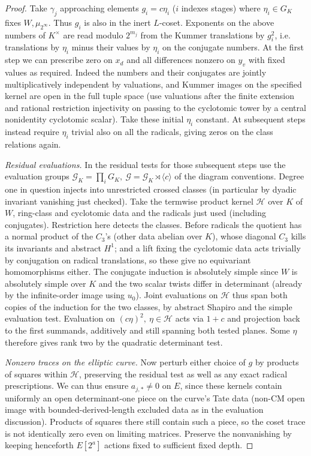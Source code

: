 \begin{proof}
Take \(\gamma_j\) approaching elements \(g_i=c\eta_i\) (\(i\) indexes stages) where \(\eta_i\in G_K\) fixes \(W,\mu_{2^\infty}\). Thus \(g_i\) is also in the inert \(L\)-coset. Exponents on the above numbers of \(K^\times\) are read modulo \(2^{m_j}\) from the Kummer translations by \(g_i^2\), i.e. translations by \(\eta_i\) minus their values by \(\eta_i\) on the conjugate numbers. At the first step we can prescribe zero on \(x_d\) and all differences nonzero on \(y_v\) with fixed values as required. Indeed the numbers and their conjugates are jointly multiplicatively independent by valuations, and Kummer images on the specified kernel are open in the full tuple space (use valuations after the finite extension and rational restriction injectivity on passing to the cyclotomic tower by a central nonidentity cyclotomic scalar). Take these initial \(\eta_i\) constant. At subsequent steps instead require \(\eta_i\) trivial also on all the radicals, giving zeros on the class relations again.

\emph{Residual evaluations.}
In the residual tests for those subsequent steps use the evaluation groups \(\mathcal G_K=\prod_i G_K,\ \mathcal G=\mathcal G_K\rtimes\langle c\rangle\) of the diagram conventions. Degree one in question injects into unrestricted crossed classes (in particular by dyadic invariant vanishing just checked). Take the termwise product kernel \(\mathcal H\) over \(K\) of \(W\), ring-class and cyclotomic data and the radicals just used (including conjugates). Restriction here detects the classes. Before radicals the quotient has a normal product of the \(C_3\)'s (other data abelian over \(K\)), whose diagonal \(C_3\) kills its invariants and abstract \(H^1\); and a lift fixing the cyclotomic data acts trivially by conjugation on radical translations, so these give no equivariant homomorphisms either. The conjugate induction is absolutely simple since \(W\) is absolutely simple over \(K\) and the two scalar twists differ in determinant (already by the infinite-order image using \(u_0\)). Joint evaluations on \(\mathcal H\) thus span both copies of the induction for the two classes, by abstract Shapiro and the simple evaluation test. Evaluation on \((c\eta)^2,\ \eta\in\mathcal H\) acts via \(1+c\) and projection back to the first summands, additively and still spanning both tested planes. Some \(\eta\) therefore gives rank two by the quadratic determinant test.

\emph{Nonzero traces on the elliptic curve.}
Now perturb either choice of \(g\) by products of squares within \(\mathcal H\), preserving the residual test as well as any exact radical prescriptions. We can thus ensure \(a_{j,*}\ne0\) on \(E\), since these kernels contain uniformly an open determinant-one piece on the curve's Tate data (non-CM open image with bounded-derived-length excluded data as in the evaluation discussion). Products of squares there still contain such a piece, so the coset trace is not identically zero even on limiting matrices. Preserve the nonvanishing by keeping henceforth \(E[2^a]\) actions fixed to sufficient fixed depth.


\end{proof}
